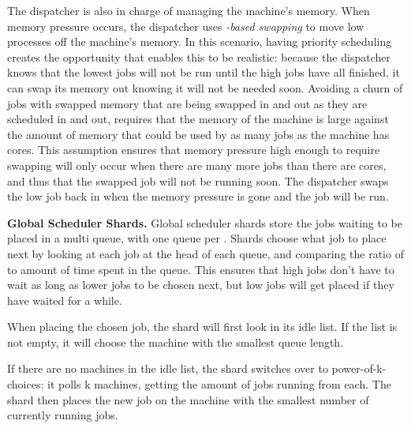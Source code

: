 The dispatcher is also in charge of managing the machine's memory. When memory
pressure occurs, the dispatcher uses \textit{\class{}-based swapping} to move low
\class{} processes off the machine's memory. In this scenario, having priority
scheduling creates the opportunity that enables this to be realistic: because
the dispatcher knows that the lowest \class{} jobs will not be run until the
high \class{} jobs have all finished, it can swap its memory out knowing it will
not be needed soon. Avoiding a churn of jobs with swapped memory that are being
swapped in and out as they are scheduled in and out, requires that the memory of
the machine is large against the amount of memory that could be used by as many
jobs as the machine has cores. This assumption ensures that memory pressure high
enough to require swapping will only occur when there are many more jobs than
there are cores, and thus that the swapped job will not be running soon. The
dispatcher swaps the low \class{} job back in when the memory pressure is gone
and the job will be run.



\textbf{Global Scheduler Shards.}
Global scheduler shards store the jobs waiting to be placed in a multi queue,
with one queue per \priceclass{}. Shards choose what job to place next by
looking at each job at the head of each queue, and comparing the ratio of
\class{} to amount of time spent in the queue. This ensures that high \class{}
jobs don't have to wait as long as lower \class{} jobs to be chosen next, but
low \class{} jobs will get placed if they have waited for a while.

When placing the chosen job, the shard will first look in its idle list. If the
list is not empty, it will choose the machine with the smallest queue length.

If there are no machines in the idle list, the shard switches over to
power-of-k-choices: it polls k machines, getting the amount of jobs running from
each. The shard then places the new job on the machine with the smallest number
of currently running jobs. 

